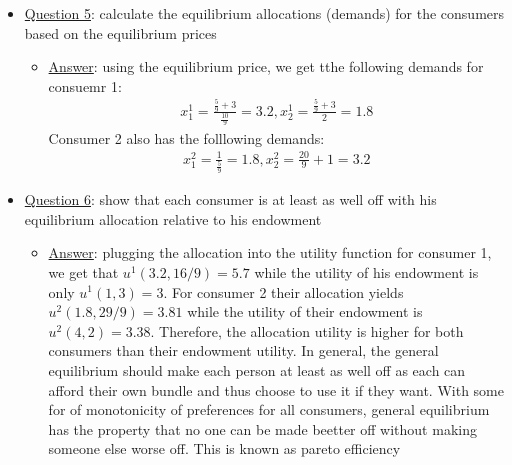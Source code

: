 \documentclass{article}
\begin{document}
  \begin{itemize}
    \item  \underline{Question 5}: calculate the equilibrium allocations (demands) for the consumers based on the equilibrium prices
    \begin{itemize}
      \item  \underline{Answer}: using the equilibrium price, we get tthe following demands for consuemr 1:
      \begin{gather*}
        x_{1}^{1} = \frac{\tfrac{5}{9} + 3}{\tfrac{10}{9}} = 3.2, x_{2}^{1} = \frac{\tfrac{5}{9} + 3}{2} = 1.8
      \end{gather*}
      Consumer 2 also has the folllowing demands:
      \begin{gather*}
        x_{1}^{2} = \frac{1}{\tfrac{5}{9}} = 1.8, x_{2}^{2} = \frac{20}{9} + 1 = 3.2
      \end{gather*}
    \end{itemize}
  \end{itemize}
  \begin{itemize}
    \item  \underline{Question 6}: show that each consumer is at least as well off with his equilibrium allocation relative to his endowment
    \begin{itemize}
      \item  \underline{Answer}: plugging the allocation into the utility function for consumer 1, we get that $u^{1}(3.2, 16/9) = 5.7$ while the utility of his endowment is only $u^{1}(1,3) = 3$. For consumer 2 their allocation yields $u^{2}(1.8, 29/9) = 3.81$ while the utility of their endowment is $u^{2}(4,2) = 3.38$. Therefore, the allocation utility is higher for both consumers than their endowment utility. In general, the general equilibrium should make each person at least as well off as each can afford their own bundle and thus choose to use it if they want. With some for of monotonicity of preferences for all consumers, general equilibrium has the property that no one can be made beetter off without making someone else worse off. This is known as pareto efficiency
     \end{itemize}
  \end{itemize}
\par
\vspace{6mm}
\end{document}
